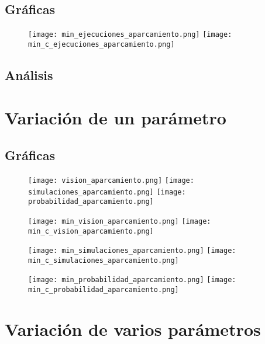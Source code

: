 \subsection{Gráficas}

\begin{figure}[h]
\texttt{[image: min\_ejecuciones\_aparcamiento.png]}
\texttt{[image: min\_c\_ejecuciones\_aparcamiento.png]}
\centering
\end{figure}


\subsection{Análisis}

\section{Variación de un parámetro}
\subsection{Gráficas}

\begin{figure}[h]
\texttt{[image: vision\_aparcamiento.png]}
\texttt{[image: simulaciones\_aparcamiento.png]}
\texttt{[image: probabilidad\_aparcamiento.png]}
\centering
\end{figure}


\begin{figure}[h]
\texttt{[image: min\_vision\_aparcamiento.png]}
\texttt{[image: min\_c\_vision\_aparcamiento.png]}
\centering
\end{figure}
\begin{figure}[h]
\texttt{[image: min\_simulaciones\_aparcamiento.png]}
\texttt{[image: min\_c\_simulaciones\_aparcamiento.png]}
\centering
\end{figure}
\begin{figure}[h]
\texttt{[image: min\_probabilidad\_aparcamiento.png]}
\texttt{[image: min\_c\_probabilidad\_aparcamiento.png]}
\centering
\end{figure}

\section{Variación de varios parámetros}
